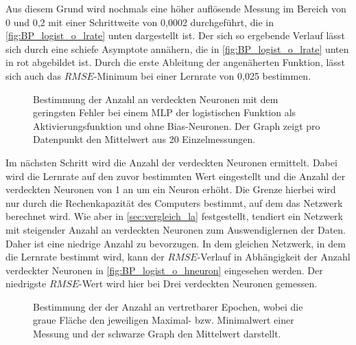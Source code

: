 Aus diesem Grund wird nochmals eine höher auflösende Messung im Bereich von 0 und 0,2 mit einer Schrittweite von 0,0002 durchgeführt, die in \autoref{fig:BP_logist_o_lrate} unten dargestellt ist. Der sich so ergebende Verlauf lässt sich durch eine schiefe Asymptote annähern, die in \autoref{fig:BP_logist_o_lrate} unten in rot abgebildet ist. Durch die erste Ableitung der angenäherten Funktion, lässt sich auch das $RMSE$-Minimum bei einer Lernrate von 0,025 bestimmen.\\


\begin{figure}[!htb]
    \centering
        
    \caption[Beispiel zur Bestimmung der Anzahl verdeckter Neuronen beim BP]{Bestimmung der Anzahl an verdeckten Neuronen mit dem geringsten Fehler bei einem MLP der logistischen Funktion als Aktivierungsfunktion und ohne Bias-Neuronen. Der Graph zeigt pro Datenpunkt den Mittelwert aus 20 Einzelmessungen.}
    \label{fig:BP_logist_o_hneuron}
\end{figure}

Im nächsten Schritt wird die Anzahl der verdeckten Neuronen ermittelt. Dabei wird die Lernrate auf den zuvor bestimmten Wert eingestellt und die Anzahl der verdeckten Neuronen von 1 an um ein Neuron erhöht. Die Grenze hierbei wird nur durch die Rechenkapazität des Computers bestimmt, auf dem das Netzwerk berechnet wird. Wie aber in \autoref{sec:vergleich_la} festgestellt, tendiert ein Netzwerk mit steigender Anzahl an verdeckten Neuronen zum Auswendiglernen der Daten. Daher ist eine niedrige Anzahl zu bevorzugen. In dem gleichen Netzwerk, in dem die Lernrate bestimmt wird, kann der $RMSE$-Verlauf in Abhängigkeit der Anzahl verdeckter Neuronen in \autoref{fig:BP_logist_o_hneuron} eingesehen werden. Der niedrigste $RMSE$-Wert wird hier bei Drei verdeckten Neuronen gemessen.%

\begin{figure}[!htb]
    \centering
        
    \caption[Beispiel zur Bestimmung der Anzahl an Epochen]{Bestimmung der der Anzahl an vertretbarer Epochen, wobei die graue Fläche den jeweiligen Maximal- bzw. Minimalwert einer Messung und der schwarze Graph den Mittelwert darstellt.}
    \label{fig:BP_logis_o_epochen}
\end{figure}

